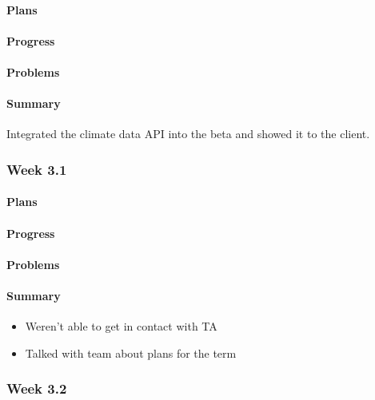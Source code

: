 \documentclass[onecolumn, draftclsnofoot,10pt, compsoc]{article}
\begin{document}
			\paragraph{Plans} \hfill \break

			\paragraph{Progress} \hfill \break

			\paragraph{Problems} \hfill \break

			\paragraph{Summary} \hfill \break
			    Integrated the climate data API into the beta and showed it to the client.

		\subsubsection{Week 3.1}
		    \paragraph{Plans} \hfill \break

		    \paragraph{Progress} \hfill \break

		    \paragraph{Problems} \hfill \break

		    \paragraph{Summary} \hfill \break
				\begin{itemize}
                    \item Weren't able to get in contact with TA
                    \item Talked with team about plans for the term
                \end{itemize}

        \subsubsection{Week 3.2}
\end{document}
